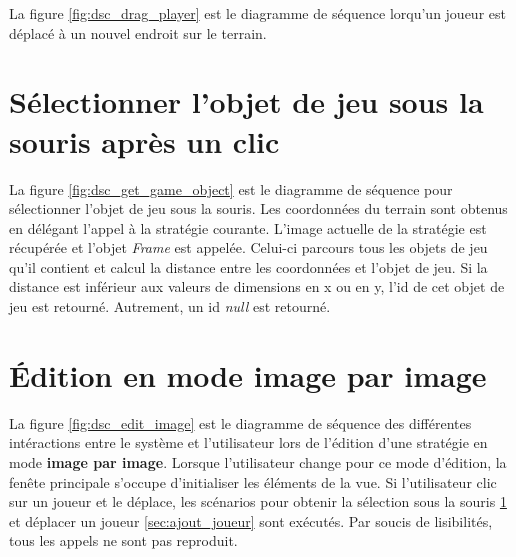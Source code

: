 
La figure \ref{fig:dsc_drag_player} est le diagramme de séquence lorqu'un joueur est déplacé à un nouvel endroit sur le terrain.

\section{Sélectionner l'objet de jeu sous la souris après un clic}
\label{sec:convertir_clic_en_objet}


La figure \ref{fig:dsc_get_game_object} est le diagramme de séquence pour sélectionner l'objet de jeu sous la souris.
Les coordonnées du terrain sont obtenus en délégant l'appel à la stratégie courante.
L'image actuelle de la stratégie est récupérée et l'objet \textit{Frame} est appelée.
Celui-ci parcours tous les objets de jeu qu'il contient et calcul la distance entre les coordonnées et l'objet de jeu.
Si la distance est inférieur aux valeurs de dimensions en x ou en y, l'id de cet objet de jeu est retourné.
Autrement, un id \textit{null} est retourné.

\section{Édition en mode image par image}
\label{sec:edition_image_par_image}


La figure \ref{fig:dsc_edit_image} est le diagramme de séquence des différentes intéractions entre le système et l'utilisateur lors de l'édition d'une stratégie en mode \textbf{image par image}.
Lorsque l'utilisateur change pour ce mode d'édition, la fenête principale s'occupe d'initialiser les éléments de la vue.
Si l'utilisateur clic sur un joueur et le déplace, les scénarios pour obtenir la sélection sous la souris \ref{sec:convertir_clic_en_objet} et déplacer un joueur \ref{sec:ajout_joueur} sont exécutés.
Par soucis de lisibilités, tous les appels ne sont pas reproduit.

